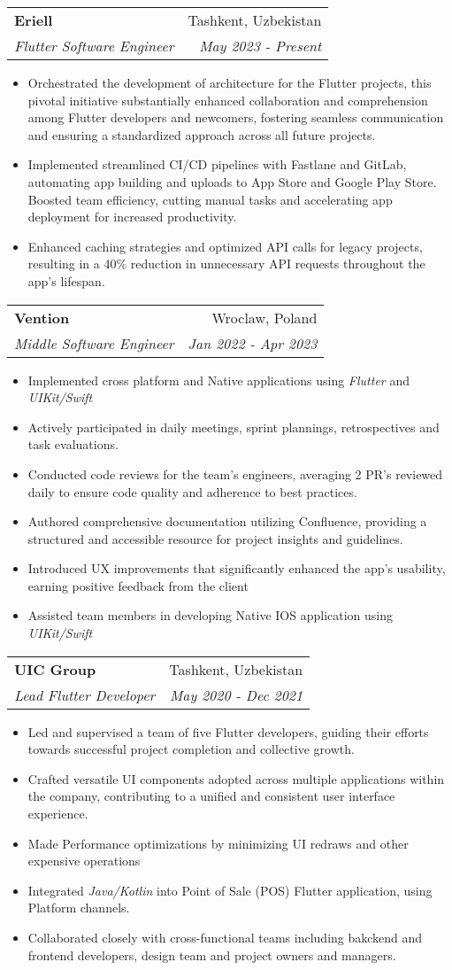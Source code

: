 \documentclass[letterpaper,11pt]{article}
\makeatletter
\newcommand{\resumeSubheading}[4]{
  \vspace{-1pt}\item
    \begin{tabular*}{0.97\textwidth}[t]{l@{\extracolsep{\fill}}r}
      \textbf{#1} & #2 \\
      \textit{\small#3} & \textit{\small #4} \\
    \end{tabular*}\vspace{-5pt}
}
\newcommand{\resumeItemListStart}{\begin{itemize}}
\newcommand{\resumeItemListEnd}{\end{itemize}\vspace{-5pt}}
\makeatother
\begin{document}
    \resumeSubheading
      {Eriell}{Tashkent, Uzbekistan}
      {Flutter Software Engineer}{May 2023 - Present}
      \resumeItemListStart
	  \item{Orchestrated the development of architecture for the Flutter projects, this pivotal initiative substantially enhanced collaboration and comprehension among Flutter developers and newcomers, fostering seamless communication and ensuring a standardized approach across all future projects.}
	  \item{Implemented streamlined CI/CD pipelines with Fastlane and GitLab, automating app building and uploads to App Store and Google Play Store. Boosted team efficiency, cutting manual tasks and accelerating app deployment for increased productivity.}
	  \item{Enhanced caching strategies and optimized API calls for legacy projects, resulting in a 40\% reduction in unnecessary API requests throughout the app's lifespan.}
      \resumeItemListEnd
      

    \resumeSubheading
      {Vention}{Wroclaw, Poland}
      {Middle Software Engineer}{Jan 2022 - Apr 2023}
      \resumeItemListStart
	  \item{Implemented cross platform and Native applications using {\em Flutter} and \em UIKit/Swift}
          \item{Actively participated in daily meetings, sprint plannings, retrospectives and task evaluations.}
          \item{Conducted code reviews for the team's engineers, averaging 2 PR's reviewed daily to ensure code quality and adherence to best practices.}
          \item{Authored comprehensive documentation utilizing Confluence, providing a structured and accessible resource for project insights and guidelines.}
          \item{Introduced UX improvements that significantly enhanced the app's usability, earning positive feedback from the client}
          \item{Assisted team members in developing Native IOS application using \em UIKit/Swift}
      \resumeItemListEnd

    \resumeSubheading
      {UIC Group}{Tashkent, Uzbekistan}
      {Lead Flutter Developer}{May 2020 - Dec 2021}
      \resumeItemListStart
	  \item{Led and supervised a team of five Flutter developers, guiding their efforts towards successful project completion and collective growth.}
	  \item{Crafted versatile UI components adopted across multiple applications within the company, contributing to a unified and consistent user interface experience.}
	  \item{Made Performance optimizations by minimizing UI redraws and other expensive operations}
	  \item{Integrated {\em Java/Kotlin} into Point of Sale (POS) Flutter application, using Platform channels.}
	  \item{Collaborated closely with cross-functional teams including bakckend and frontend developers, design team and project owners and managers.}
      \resumeItemListEnd
\end{document}
